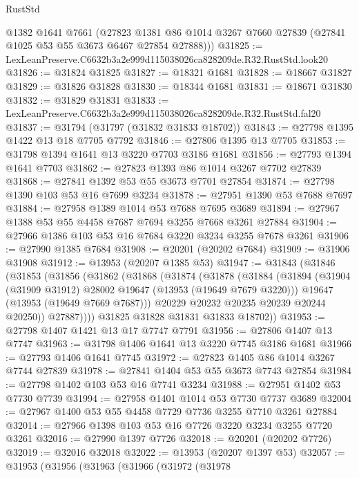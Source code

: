\begin{lexlean}{RustStd}
\begin{coremodule}
      @1382
      @1641
      @7661
      (@27823 @1381 @86 @1014 @3267 @7660 @27839 (@27841 @1025 @53 @55 @3673 @6467 @27854 @27888)))
@31825 := LexLeanPreserve.C6632b3a2e999d115038026ca828209de.R32.RustStd.look20
@31826 := @31824 @31825
@31827 := @18321 @1681
@31828 := @18667 @31827
@31829 := @31826 @31828
@31830 := @18344 @1681
@31831 := @18671 @31830
@31832 := @31829 @31831
@31833 := LexLeanPreserve.C6632b3a2e999d115038026ca828209de.R32.RustStd.fal20
@31837 := @31794 (@31797 (@31832 @31833 @18702))
@31843 := @27798 @1395 @1422 @13 @18 @7705 @7792
@31846 := @27806 @1395 @13 @7705
@31853 := @31798 @1394 @1641 @13 @3220 @7703 @3186 @1681
@31856 := @27793 @1394 @1641 @7703
@31862 := @27823 @1393 @86 @1014 @3267 @7702 @27839
@31868 := @27841 @1392 @53 @55 @3673 @7701 @27854
@31874 := @27798 @1390 @103 @53 @16 @7699 @3234
@31878 := @27951 @1390 @53 @7688 @7697
@31884 := @27958 @1389 @1014 @53 @7688 @7695 @3689
@31894 := @27967 @1388 @53 @55 @4458 @7687 @7694 @3255 @7668 @3261 @27884
@31904 := @27966 @1386 @103 @53 @16 @7684 @3220 @3234 @3255 @7678 @3261
@31906 := @27990 @1385 @7684
@31908 := @20201 (@20202 @7684)
@31909 := @31906 @31908
@31912 := @13953 (@20207 @1385 @53)
@31947 := @31843
    (@31846
      (@31853
        (@31856
          (@31862
            (@31868
              (@31874
                (@31878
                  (@31884
                    (@31894
                      (@31904 (@31909 @31912) @28002 @19647 (@13953 (@19649 @7679 @3220)))
                      @19647
                      (@13953 (@19649 @7669 @7687)))
                    @20229
                    @20232
                    @20235
                    @20239
                    @20244
                    @20250))
                @27887))))
        @31825
        @31828
        @31831
        @31833
        @18702))
@31953 := @27798 @1407 @1421 @13 @17 @7747 @7791
@31956 := @27806 @1407 @13 @7747
@31963 := @31798 @1406 @1641 @13 @3220 @7745 @3186 @1681
@31966 := @27793 @1406 @1641 @7745
@31972 := @27823 @1405 @86 @1014 @3267 @7744 @27839
@31978 := @27841 @1404 @53 @55 @3673 @7743 @27854
@31984 := @27798 @1402 @103 @53 @16 @7741 @3234
@31988 := @27951 @1402 @53 @7730 @7739
@31994 := @27958 @1401 @1014 @53 @7730 @7737 @3689
@32004 := @27967 @1400 @53 @55 @4458 @7729 @7736 @3255 @7710 @3261 @27884
@32014 := @27966 @1398 @103 @53 @16 @7726 @3220 @3234 @3255 @7720 @3261
@32016 := @27990 @1397 @7726
@32018 := @20201 (@20202 @7726)
@32019 := @32016 @32018
@32022 := @13953 (@20207 @1397 @53)
@32057 := @31953
    (@31956
      (@31963
        (@31966
          (@31972
            (@31978

\end{coremodule}
\end{lexlean}
